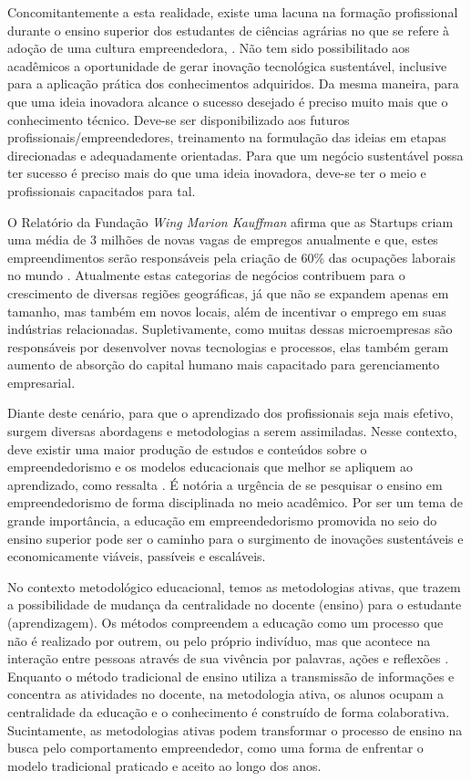 Concomitantemente a esta realidade, existe uma lacuna na formação profissional durante o ensino superior dos estudantes de ciências agrárias no que se refere à adoção de uma cultura empreendedora, \cite{araujo_educacao_2019}. Não tem sido possibilitado aos acadêmicos a oportunidade de gerar inovação tecnológica sustentável, inclusive para a aplicação prática dos conhecimentos adquiridos. Da mesma maneira, para que uma ideia inovadora alcance o sucesso desejado é preciso muito mais que o conhecimento técnico. Deve-se ser disponibilizado aos futuros profissionais/empreendedores, treinamento na formulação das ideias em etapas direcionadas e adequadamente orientadas. Para que um negócio sustentável possa ter sucesso é preciso mais do que uma ideia inovadora, deve-se ter o meio e profissionais capacitados para tal. 


O Relatório da Fundação \textit{Wing Marion Kauffman} afirma que as Startups criam uma média de 3 milhões de novas vagas de empregos anualmente e que, estes empreendimentos serão responsáveis pela criação de 60\% das ocupações laborais no mundo \cite{brasil_o_2017}. Atualmente estas categorias de negócios contribuem para o crescimento de diversas regiões geográficas, já que não se expandem apenas em tamanho, mas também em novos locais, além de incentivar o emprego em suas indústrias relacionadas. Supletivamente, como muitas dessas microempresas são responsáveis por desenvolver novas tecnologias e processos, elas também geram aumento de absorção do capital humano mais capacitado para gerenciamento empresarial.


Diante deste cenário, para que o aprendizado dos profissionais seja mais efetivo, surgem diversas abordagens e metodologias a serem assimiladas. Nesse contexto, deve existir uma maior produção de estudos e conteúdos sobre o empreendedorismo e os modelos educacionais que melhor se apliquem ao aprendizado, como ressalta . É notória a urgência de se pesquisar o ensino em empreendedorismo de forma disciplinada no meio acadêmico. Por ser um tema de grande importância, a educação em empreendedorismo promovida no seio do ensino superior pode ser o caminho para o surgimento de inovações sustentáveis e economicamente viáveis, passíveis e escaláveis.

No contexto metodológico educacional, temos as metodologias ativas, que trazem a possibilidade de mudança da centralidade no docente (ensino) para o estudante (aprendizagem). Os métodos compreendem a educação como um processo que não é realizado por outrem, ou pelo próprio indivíduo, mas que acontece na interação entre pessoas através de sua vivência por palavras, ações e reflexões \cite{paiva_metodologias_2016}. Enquanto o método tradicional de ensino utiliza a transmissão de informações e concentra as atividades no docente, na metodologia ativa, os alunos ocupam a centralidade da educação e o conhecimento é construído de forma colaborativa. Sucintamente, as metodologias ativas podem transformar o processo de ensino na busca pelo comportamento empreendedor, como uma forma de enfrentar o modelo tradicional praticado e aceito ao longo dos anos.
 
